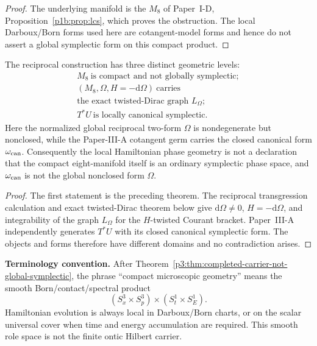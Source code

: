 \documentclass[12pt,a4paper]{article}
\begin{document}
\begin{proof}
The underlying manifold is the \(M_8\) of Paper~I-D,
Proposition~\ref{p1b:prop:lcs}, which proves the obstruction.  The local
Darboux/Born forms used here are cotangent-model forms and hence do not
assert a global symplectic form on this compact product.
\end{proof}

\begin{corollary}
\label{p3b:cor:global-local-phase-geometry-hierarchy}
The reciprocal construction has three distinct geometric levels:
\[
\boxed{\begin{gathered}
M_8\ \text{is compact and not globally symplectic};\\[0.25em]
(M_8,\Omega,H=-\mathrm d\Omega)\ \text{carries}\\
\text{the exact twisted-Dirac graph }L_\Omega;\\[0.25em]
T^*U\ \text{is locally canonical symplectic}.
\end{gathered}}
\]
Here the normalized global reciprocal two-form \(\Omega\) is nondegenerate
but nonclosed, while the Paper-III-A cotangent germ carries the closed
canonical form \(\omega_{\rm can}\).  Consequently the local Hamiltonian
phase geometry is not a declaration that the compact eight-manifold itself is
an ordinary symplectic phase space, and \(\omega_{\rm can}\) is not the
global nonclosed form \(\Omega\).
\end{corollary}
\begin{proof}
The first statement is the preceding theorem.  The reciprocal transgression
calculation and exact twisted-Dirac theorem below give
\(\mathrm d\Omega\neq0\), \(H=-\mathrm d\Omega\), and integrability of the graph
\(L_\Omega\) for the \(H\)-twisted Courant bracket.  Paper~III-A independently
generates \(T^*U\) with its closed canonical symplectic form.  The objects and
forms therefore have different domains and no contradiction arises.
\end{proof}


\begin{mdframed}[nobreak=true]
\noindent\textbf{Terminology convention.}
After Theorem~\ref{p3:thm:completed-carrier-not-global-symplectic}, the phrase ``compact
microscopic geometry'' means the smooth Born/contact/spectral product
\[
(S^3_x\times S^3_p)\times(S^1_t\times S^1_E).
\]
Hamiltonian evolution is always local in Darboux/Born charts, or on the scalar universal cover when
time and energy accumulation are required.  This smooth role space is not the finite ontic Hilbert
carrier.
\end{mdframed}
\end{document}
